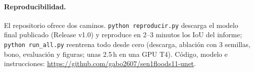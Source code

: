 \documentclass{article}
\begin{document}
\paragraph{Reproducibilidad.} El repositorio ofrece dos caminos. \texttt{python reproducir.py}
descarga el modelo final publicado (Release v1.0) y reproduce en 2--3 minutos los IoU del informe;
\texttt{python run\_all.py} reentrena todo desde cero (descarga, ablación con 3 semillas, bono,
evaluación y figuras; unas 2.5\,h en una GPU T4). Código, modelo e instrucciones:
\url{https://github.com/gabo2607/sen1floods11-unet}.

{\small


}
\end{document}

